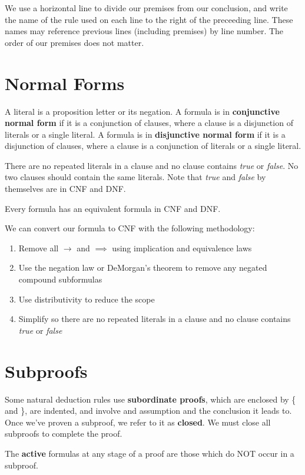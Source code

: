 \documentclass[12pt]{article}
\begin{document}
We use a horizontal line to divide our premises from our conclusion, and write the name of the rule used on each line to the right of the preceeding line. These names may reference previous lines (including premises) by line number. The order of our premises does not matter.

\section*{Normal Forms}
A literal is a proposition letter or its negation. A formula is in {\bf conjunctive normal form} if it is a conjunction of clauses, where a clause is a disjunction of literals or a single literal. A formula is in {\bf disjunctive normal form} if it is a disjunction of clauses, where a clause is a conjunction of literals or a single literal.

There are no repeated literals in a clause and no clause contains \emph{true} or \emph{false}. No two clauses should contain the same literals. Note that \emph{true} and \emph{false} by themselves are in CNF and DNF.

Every formula has an equivalent formula in CNF and DNF.

We can convert our formula to CNF with the following methodology:
\begin{enumerate}
\item Remove all $\rightarrow$ and $\implies$ using implication and equivalence laws
\item Use the negation law or DeMorgan's theorem to remove any negated compound subformulas
\item Use distributivity to reduce the scope
\item Simplify so there are no repeated literals in a clause and no clause contains \emph{true} or \emph{false}
\end{enumerate}

\section*{Subproofs}
Some natural deduction rules use {\bf subordinate proofs}, which are enclosed by \{ and \}, are indented, and involve and assumption and the conclusion it leads to. Once we've proven a subproof, we refer to it as {\bf closed}. We must close all subproofs to complete the proof.

The {\bf active} formulas at any stage of a proof are those which do NOT occur in a subproof.
\end{document}
